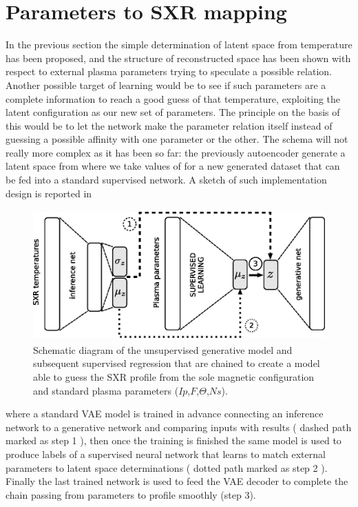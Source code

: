 \section{Parameters to SXR mapping}
\label{section:Parameters_to_SXR}

In the previous section the simple determination of latent space from temperature has been proposed, and the structure of reconstructed space has been shown with respect to external plasma parameters trying to speculate a possible relation.
Another possible target of learning would be to see if such parameters are a complete information to reach a good guess of that temperature, exploiting the latent configuration as our new set of parameters.
The principle on the basis of this would be to let the network make the parameter relation itself instead of guessing a possible affinity with one parameter or the other.
The schema will not really more complex as it has been so far: the previously autoencoder generate a latent space from where we take values of for a new generated dataset that can be fed into a standard supervised network. 
A sketch of such implementation design is reported in~\Figure{\ref{fig:SXR_from_param}}
\begin{figure}
    \centering
    \includegraphics[height=5cm]{img/STEP12_7/SXR_from_PARAMS.eps}
    \caption{Schematic diagram of the unsupervised generative model and subsequent supervised regression that are chained to create a model able to guess the SXR profile from the sole magnetic configuration and standard plasma parameters ($Ip$,$F$,$\Theta$,$Ns$). }
    \label{fig:SXR_from_param}
\end{figure}
where a standard \acs{VAE} model is trained in advance connecting an inference network to a generative network and comparing inputs with results ( dashed path marked as step 1 ), then once the training is finished the same model is used to produce labels of a supervised neural network that learns to match external parameters to latent space determinations ( dotted path marked as step 2 ). Finally the last trained network is used to feed the \acs{VAE} decoder to complete the chain passing from parameters to profile smoothly (step 3).

